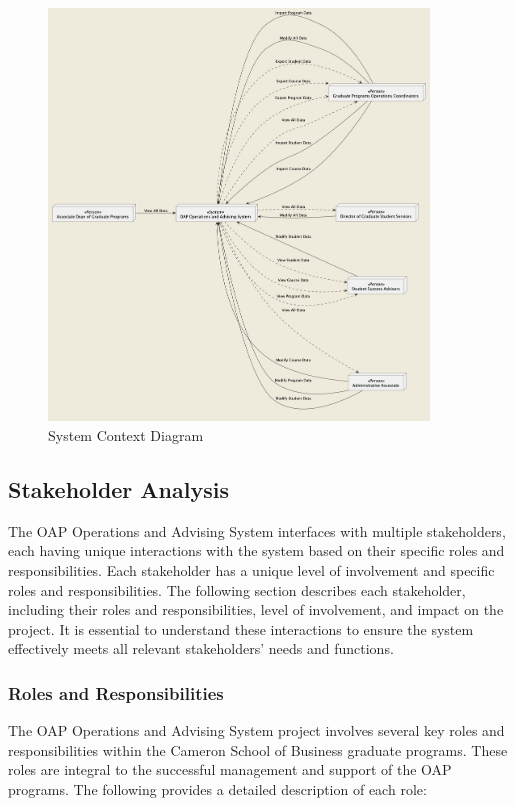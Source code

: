 \documentclass[12pt]{article}
\begin{document}
\begin{figure}[ht]
    \centering
    \includegraphics[width=0.9\textwidth,height=0.9\textheight,keepaspectratio]{system-context-diagram}
    \caption{System Context Diagram}
    \label{fig: system-context-diagram}
\end{figure}

\subsection{Stakeholder Analysis}
The OAP Operations and Advising System interfaces with multiple stakeholders, each having unique interactions with the system based on their specific roles and responsibilities. Each stakeholder has a unique level of involvement and specific roles and responsibilities. The following section describes each stakeholder, including their roles and responsibilities, level of involvement, and impact on the project. It is essential to understand these interactions to ensure the system effectively meets all relevant stakeholders' needs and functions.

\subsubsection{Roles and Responsibilities}
The OAP Operations and Advising System project involves several key roles and responsibilities within the Cameron School of Business graduate programs. These roles are integral to the successful management and support of the OAP programs. The following provides a detailed description of each role:
\end{document}
